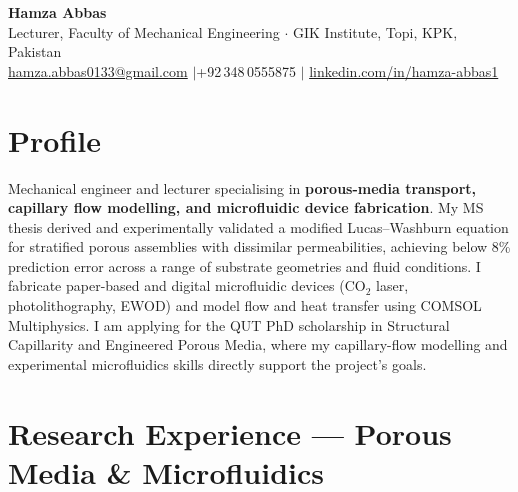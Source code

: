 \documentclass[11pt,a4paper]{article}
\begin{document}

\begin{center}
  {\LARGE\bfseries\color{accent} Hamza Abbas}\\[4pt]
  Lecturer, Faculty of Mechanical Engineering $\cdot$ GIK Institute, Topi, KPK,
  Pakistan\\[3pt]
  \href{mailto:hamza.abbas0133@gmail.com}{hamza.abbas0133@gmail.com}
  \quad$|$\quad +92\,348\,0555875
  \quad$|$\quad
  \href{https://linkedin.com/in/hamza-abbas1}{linkedin.com/in/hamza-abbas1}
\end{center}

\section{Profile}

Mechanical engineer and lecturer specialising in \textbf{porous-media transport,
capillary flow modelling, and microfluidic device fabrication}. My MS thesis
derived and experimentally validated a modified Lucas--Washburn equation for
stratified porous assemblies with dissimilar permeabilities, achieving below 8\%
prediction error across a range of substrate geometries and fluid conditions. I
fabricate paper-based and digital microfluidic devices (CO$_2$ laser, photolithography,
EWOD) and model flow and heat transfer using COMSOL Multiphysics. I am applying for
the QUT PhD scholarship in Structural Capillarity and Engineered Porous Media, where
my capillary-flow modelling and experimental microfluidics skills directly support the
project's goals.

\section{Research Experience — Porous Media \& Microfluidics}
\end{document}
